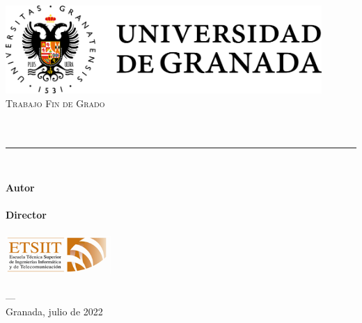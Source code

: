 \begin{titlepage}
        
    \newlength{\centeroffset}
    \setlength{\centeroffset}{-0.5\oddsidemargin}
    \addtolength{\centeroffset}{0.5\evensidemargin}
    \thispagestyle{empty}

    \noindent\hspace*{\centeroffset}\begin{minipage}{\textwidth}
        \centering
        \includegraphics[width=0.9\textwidth]{image/logo_ugr_horizontal.png}\\[1.4cm]

        \textsc{ \Large Trabajo Fin de Grado\\[0.2cm]}
        \textsc{ \myDegree }\\[1cm]
        { \Huge\bfseries \myTitleShort\\ }
        \noindent\rule[-1ex]{ \textwidth }{3pt}\\[3.5ex]
        { \large\bfseries \myTitle }
    \end{minipage}

    \vspace{2.5cm}
    \noindent\hspace*{\centeroffset}\begin{minipage}{\textwidth}
    \centering

    \textbf{Autor}\\ {\myName}\\[2.5ex]
    \textbf{Director}\\ {\myProf}\\[2cm]

    \includegraphics[width=0.3\textwidth]{image/etsiit_logo.png}\\[0.1cm]
    \textsc{\myFaculty}\\

    \textsc{---}\\
    Granada, julio de 2022
    \end{minipage}
\end{titlepage}


